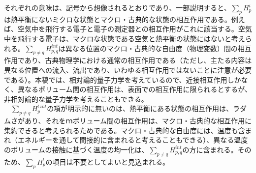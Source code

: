 それぞれの意味は、記号から想像されるとおりであり、一部説明すると、$\sum_p H_p^i$は熱平衡にないミクロな状態とマクロ・古典的な状態の相互作用である。例えば、空気中を飛行する電子と電子の測定器との相互作用がこれに該当する。空気中を飛行する電子は、マクロな状態である空気と熱平衡の状態にはないと考えられる。$\sum_{p \neq q}H^{int}_{p,q}$は異なる位置のマクロ・古典的な自由度（物理変数）間の相互作用であり、古典物理学における通常の相互作用である（ただし、主たる内容は異なる位置への流入、流出であり、いわゆる相互作用ではないことに注意が必要である）。本稿では、相対論的量子力学を考えているので、近接相互作用しかなく、異なるボリューム間の相互作用は、表面での相互作用に限られるとするが、非相対論的な量子力学を考えることもできる。\\
　$\sum_{p \neq q} H_p^{t\,int}$の項が明示的に無いのは、熱平衡にある状態の相互作用は、ラダムさがあり、それをｍボリューム間の相互作用は、マクロ・古典的な相互作用に集約できると考えられるためである。マクロ・古典的な自由度には、温度も含まれ（エネルギーを通して間接的に含まれると考えることもできる）、異なる温度のボリュームの接触に基づく温度の均一化は、$\sum_{p \neq q} H^{int}_{p,q}$の方に含まれる。そのため、$\sum_pH_p^t$の項目は不要としてよいと見込まれる。